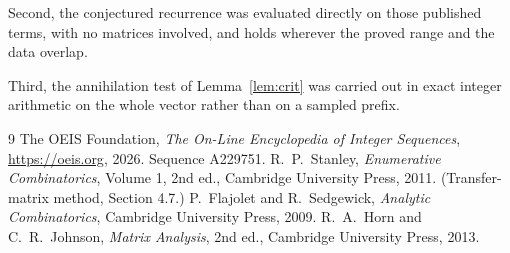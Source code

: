 \documentclass[11pt,a4paper]{article}
\theoremstyle{plain}
\theoremstyle{definition}
\begin{document}
Second, the conjectured recurrence was evaluated directly on those published terms, with no
matrices involved, and holds wherever the proved range and the data overlap.

Third, the annihilation test of Lemma~\ref{lem:crit} was carried out in exact integer
arithmetic on the whole vector rather than on a sampled prefix.

\begin{thebibliography}{9}
 The OEIS Foundation, \emph{The On-Line Encyclopedia of Integer
Sequences}, \url{https://oeis.org}, 2026. Sequence A229751.
 R.~P.~Stanley, \emph{Enumerative Combinatorics}, Volume 1, 2nd ed.,
Cambridge University Press, 2011. (Transfer-matrix method, Section 4.7.)
 P.~Flajolet and R.~Sedgewick, \emph{Analytic Combinatorics}, Cambridge
University Press, 2009.
 R.~A.~Horn and C.~R.~Johnson, \emph{Matrix Analysis}, 2nd ed., Cambridge
University Press, 2013.
\end{thebibliography}
\end{document}
